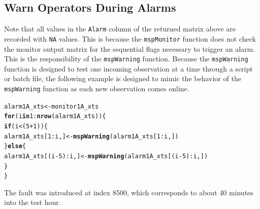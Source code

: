 \documentclass{report}\usepackage[]{graphicx}\usepackage[]{color}
\makeatletter
\newcommand{\hlnum}[1]{\textcolor[rgb]{0.686,0.059,0.569}{#1}}%
\newcommand{\hlopt}[1]{\textcolor[rgb]{0,0,0}{#1}}%
\newcommand{\hlstd}[1]{\textcolor[rgb]{0.345,0.345,0.345}{#1}}%
\newcommand{\hlkwa}[1]{\textcolor[rgb]{0.161,0.373,0.58}{\textbf{#1}}}%
\newcommand{\hlkwb}[1]{\textcolor[rgb]{0.69,0.353,0.396}{#1}}%
\newcommand{\hlkwd}[1]{\textcolor[rgb]{0.737,0.353,0.396}{\textbf{#1}}}%
\newenvironment{kframe}{%
 \def\at@end@of@kframe{}%
 \ifinner\ifhmode%
  \def\at@end@of@kframe{\end{minipage}}%
  \begin{minipage}{\columnwidth}%
 \fi\fi%
 \def\FrameCommand##1{\hskip\@totalleftmargin \hskip-\fboxsep
 \colorbox{shadecolor}{##1}\hskip-\fboxsep
     \hskip-\linewidth \hskip-\@totalleftmargin \hskip\columnwidth}%
 \MakeFramed {\advance\hsize-\width
   \@totalleftmargin\z@ \linewidth\hsize
   \@setminipage}}%
 {\par\unskip\endMakeFramed%
 \at@end@of@kframe}
\newenvironment{knitrout}{}{} %
\makeatother
\begin{document}
\subsection{Warn Operators During Alarms}
Note that all values in the \texttt{Alarm} column of the returned matrix above are recorded with \texttt{NA} values. This is because the \texttt{mspMonitor} function does not check the monitor output matrix for the sequential flags necessary to trigger an alarm. This is the responsibility of the \texttt{mspWarning} function. Because the \texttt{mspWarning} function is designed to test one incoming observation at a time through a script or batch file, the following example is designed to mimic the behavior of the \texttt{mspWarning} function as each new observation comes online.
\begin{knitrout}
\color{fgcolor}\begin{kframe}
\begin{alltt}
\hlstd{alarm1A_xts} \hlkwb{<-} \hlstd{monitor1A_xts}
\hlkwa{for}\hlstd{(i} \hlkwa{in} \hlnum{1}\hlopt{:}\hlkwd{nrow}\hlstd{(alarm1A_xts))\{}
  \hlkwa{if}\hlstd{(i} \hlopt{<} \hlstd{(}\hlnum{5} \hlopt{+} \hlnum{1}\hlstd{))\{}
    \hlstd{alarm1A_xts[}\hlnum{1}\hlopt{:}\hlstd{i,]} \hlkwb{<-} \hlkwd{mspWarning}\hlstd{(alarm1A_xts[}\hlnum{1}\hlopt{:}\hlstd{i,])}
  \hlstd{\}}\hlkwa{else}\hlstd{\{}
    \hlstd{alarm1A_xts[(i} \hlopt{-} \hlnum{5}\hlstd{)}\hlopt{:}\hlstd{i,]} \hlkwb{<-} \hlkwd{mspWarning}\hlstd{(alarm1A_xts[(i} \hlopt{-} \hlnum{5}\hlstd{)}\hlopt{:}\hlstd{i,])}
  \hlstd{\}}
\hlstd{\}}
\end{alltt}
\end{kframe}
\end{knitrout}
\noindent The fault was introduced at index 8500, which corresponds to about 40 minutes into the test hour.
\end{document}
